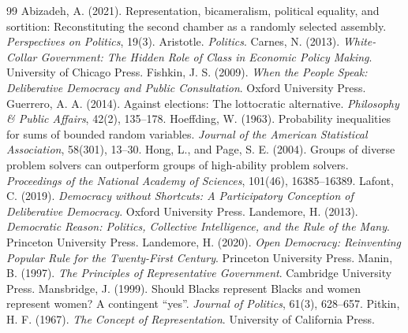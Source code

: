 \documentclass{situationist-preprint}
\begin{document}
\begin{thebibliography}{99}\small
{} Abizadeh, A. (2021). Representation, bicameralism, political equality, and sortition: Reconstituting the second chamber as a randomly selected assembly. \emph{Perspectives on Politics}, 19(3).
 Aristotle. \emph{Politics}.
 Carnes, N. (2013). \emph{White-Collar Government: The Hidden Role of Class in Economic Policy Making}. University of Chicago Press.
 Fishkin, J. S. (2009). \emph{When the People Speak: Deliberative Democracy and Public Consultation}. Oxford University Press.
 Guerrero, A. A. (2014). Against elections: The lottocratic alternative. \emph{Philosophy \& Public Affairs}, 42(2), 135--178.
 Hoeffding, W. (1963). Probability inequalities for sums of bounded random variables. \emph{Journal of the American Statistical Association}, 58(301), 13--30.
 Hong, L., and Page, S. E. (2004). Groups of diverse problem solvers can outperform groups of high-ability problem solvers. \emph{Proceedings of the National Academy of Sciences}, 101(46), 16385--16389.
 Lafont, C. (2019). \emph{Democracy without Shortcuts: A Participatory Conception of Deliberative Democracy}. Oxford University Press.
 Landemore, H. (2013). \emph{Democratic Reason: Politics, Collective Intelligence, and the Rule of the Many}. Princeton University Press.
 Landemore, H. (2020). \emph{Open Democracy: Reinventing Popular Rule for the Twenty-First Century}. Princeton University Press.
 Manin, B. (1997). \emph{The Principles of Representative Government}. Cambridge University Press.
 Mansbridge, J. (1999). Should Blacks represent Blacks and women represent women? A contingent \enquote{yes}. \emph{Journal of Politics}, 61(3), 628--657.
 Pitkin, H. F. (1967). \emph{The Concept of Representation}. University of California Press.
\end{thebibliography}
\end{document}

